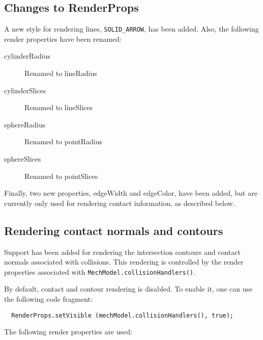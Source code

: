 \documentclass{article}
\begin{document}
\subsection*{Changes to RenderProps}

A new style for rendering lines, {\tt SOLID\_ARROW}, has been added.  Also,
the following render properties have been renamed:

\begin{description}

\item[cylinderRadius] \mbox{}
Renamed to {\sf lineRadius}

\item[cylinderSlices] \mbox{}
Renamed to {\sf lineSlices}

\item[sphereRadius] \mbox{}
Renamed to {\sf pointRadius}

\item[sphereSlices] \mbox{}
Renamed to {\sf pointSlices}

\end{description}

Finally, two new properties, {\sf edgeWidth} and {\sf edgeColor}, have been
added, but are currently only used for rendering contact information,
as described below.

\subsection*{Rendering contact normals and contours}

Support has been added for rendering the intersection contours and
contact normals associated with collisions. This rendering is
controlled by the render properties associated with
{\tt MechModel.collisionHandlers()}. 

By default, contact and contour rendering is disabled. To enable it,
one can use the following code fragment:

\begin{verbatim}
  RenderProps.setVisible (mechModel.collisionHandlers(), true);
\end{verbatim}

The following render properties are used:
\end{document}
